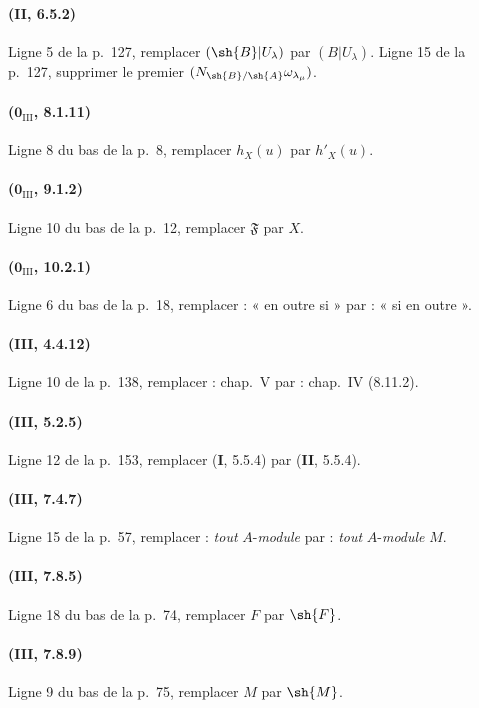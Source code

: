 \paragraph{(II, 6.5.2)}
Ligne 5 de la p.~127, remplacer $(\sh{B}|U_\lambda)$ par
$(B|U_\lambda)$. Ligne 15 de la p.~127, supprimer le premier
$(N_{\sh{B}/\sh{A}}\omega_{\lambda_\mu})$.

\paragraph{($\mathbf{0}_{\mathrm{III}}$, 8.1.11)}
Ligne 8 du bas de la p.~8, remplacer $h_X(u)$ par $h'_X(u)$.

\paragraph{($\mathbf{0}_{\mathrm{III}}$, 9.1.2)}
Ligne 10 du bas de la p.~12, remplacer $\mathfrak{F}$ par $X$.

\paragraph{($\mathbf{0}_{\mathrm{III}}$, 10.2.1)}
Ligne 6 du bas de la p.~18, remplacer : « en outre si » par : « si en
outre ».

\paragraph{(III, 4.4.12)}
Ligne 10 de la p.~138, remplacer : chap.~V par : chap.~IV (8.11.2).

\paragraph{(III, 5.2.5)}
Ligne 12 de la p.~153, remplacer (\textbf{I}, 5.5.4) par (\textbf{II}, 5.5.4).

\paragraph{(III, 7.4.7)}
Ligne 15 de la p.~57, remplacer : \emph{tout} $A$-\emph{module} par : \emph{tout}
$A$-\emph{module} $M$.

\paragraph{(III, 7.8.5)}
Ligne 18 du bas de la p.~74, remplacer $F$ par $\sh{F}$.

\paragraph{(III, 7.8.9)}
Ligne 9 du bas de la p.~75, remplacer $M$ par $\sh{M}$.

